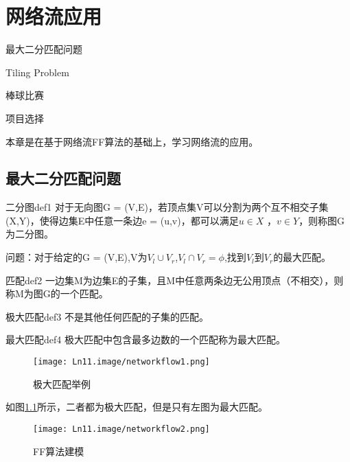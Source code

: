 \chapter{网络流应用}

\begin{introduction}
\item 最大二分匹配问题
\item Tiling Problem
\item 棒球比赛
\item 项目选择
\end{introduction}

本章是在基于网络流FF算法的基础上，学习网络流的应用。

\section{最大二分匹配问题}

\begin{definition}{二分图}{def1}
    对于无向图G = (V,E)，若顶点集V可以分割为两个互不相交子集(X,Y)，使得边集E中任意一条边e = (u,v)，都可以满足\(u \in X\) ，\(v \in Y\)，则称图G为二分图。
\end{definition}

问题：对于给定的G = (V,E),V为\(V_l \cup V_r\),\(V_l \cap V_r = \phi\),找到\(V_l\)到\(V_r\)的最大匹配。

\begin{definition}{匹配}{def2}
    一边集M为边集E的子集，且M中任意两条边无公用顶点（不相交），则称M为图G的一个匹配。
\end{definition}

\begin{definition}{极大匹配}{def3}
    不是其他任何匹配的子集的匹配。
\end{definition}

\begin{definition}{最大匹配}{def4}
    极大匹配中包含最多边数的一个匹配称为最大匹配。
\end{definition}

\begin{figure}[htb]
  \centering
  \texttt{[image: Ln11.image/networkflow1.png]}
  \caption{极大匹配举例}\label{fig1}
\end{figure}
如图\ref{fig1}所示，二者都为极大匹配，但是只有左图为最大匹配。

\begin{figure}[htb]
  \centering
  \texttt{[image: Ln11.image/networkflow2.png]}
  \caption{FF算法建模}\label{fig2}
\end{figure}

